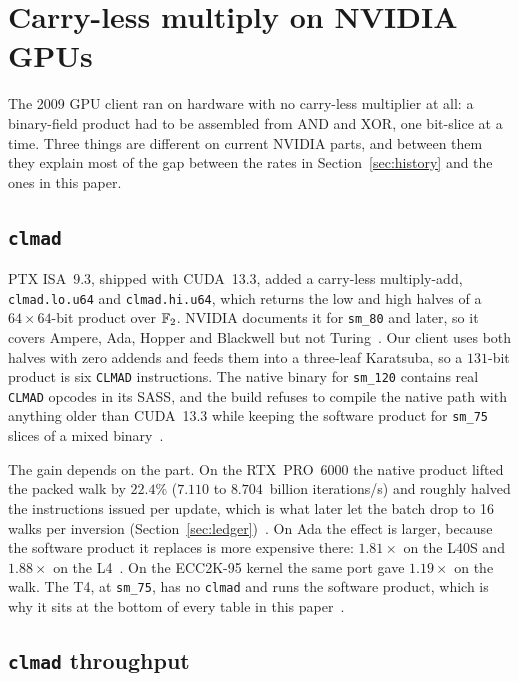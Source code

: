\section{Carry-less multiply on NVIDIA GPUs}
\label{sec:blackwell}

The 2009 GPU client ran on hardware with no carry-less multiplier at
all: a binary-field product had to be assembled from AND and XOR, one
bit-slice at a time. Three things are different on current NVIDIA
parts, and between them they explain most of the gap between the
rates in Section~\ref{sec:history} and the ones in this paper.

\subsection{\texttt{clmad}}
\label{sec:blackwell-clmad}

PTX ISA~9.3, shipped with CUDA~13.3, added a carry-less multiply-add,
\texttt{clmad.lo.u64} and \texttt{clmad.hi.u64}, which returns the low
and high halves of a $64\times64$-bit product over $\mathbb{F}_2$. NVIDIA
documents it for \texttt{sm\_80} and later, so it covers Ampere, Ada,
Hopper and Blackwell but not Turing~.
Our client uses both halves with zero addends and feeds them into a
three-leaf Karatsuba, so a $131$-bit product is six \texttt{CLMAD}
instructions. The native binary for \texttt{sm\_120} contains real
\texttt{CLMAD} opcodes in its SASS, and the build refuses to compile
the native path with anything older than CUDA~13.3 while keeping the
software product for \texttt{sm\_75} slices of a mixed
binary~.

The gain depends on the part. On the RTX~PRO~6000 the native product
lifted the packed walk by $22.4\%$ ($7.110$ to $8.704$~billion
iterations/s) and roughly halved the instructions issued per update,
which is what later let the batch drop to 16 walks per inversion
(Section~\ref{sec:ledger})~. On Ada
the effect is larger, because the software product it replaces is
more expensive there: $1.81\times$ on the L40S and $1.88\times$ on the
L4~. On the ECC2K-95 kernel the same
port gave $1.19\times$ on the walk. The T4, at \texttt{sm\_75}, has no
\texttt{clmad} and runs the software product, which is why it sits at
the bottom of every table in this paper~.

\subsection{\texttt{clmad} throughput}
\label{sec:blackwell-rates}

